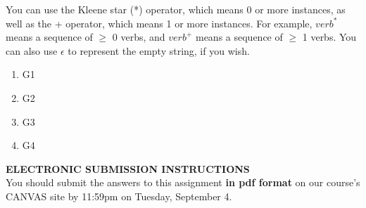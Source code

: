 \documentclass[11pt]{article}
\begin{document}
\begin{enumerate}
You can use the Kleene star (*) operator, which means 0 or more
instances, as well as the + operator, which means 1 or more
instances. For example, $verb^{*}$ means a sequence of $\geq$ 0 verbs,
and $verb^{+}$ means a sequence of $\geq$ 1 verbs. You can also use
$\epsilon$ to represent the empty string, if you wish. 

\begin{enumerate}

\item G1
\vspace*{.2in}

\item G2
\vspace*{.2in}

\item G3
\vspace*{.2in}

\item G4
\vspace*{.2in}

\end{enumerate}


\end{enumerate}  %

\newpage
\hspace*{1.5in}  {\bf ELECTRONIC SUBMISSION INSTRUCTIONS} \\

You should submit the answers to this assignment {\bf in pdf format}
on our course's CANVAS site by 11:59pm on Tuesday, September 4.
\end{document}
